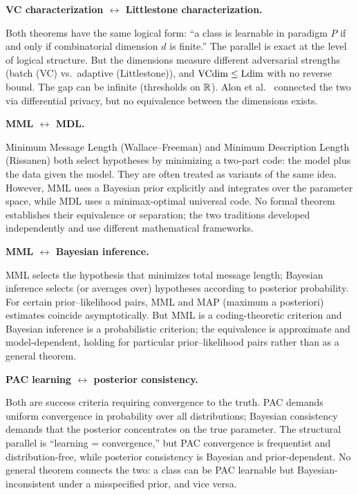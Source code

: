 \begin{obstbox}
\textbf{VC characterization $\leftrightarrow$ Littlestone
characterization.}

\medskip\noindent
Both theorems have the same logical form: ``a class is learnable in
paradigm $P$ if and only if combinatorial dimension $d$ is finite.''
The parallel is exact at the level of logical structure. But the
dimensions measure different adversarial strengths (batch (VC) vs.\
adaptive (Littlestone)), and $\mathrm{VCdim} \leq \mathrm{Ldim}$ with no reverse
bound.
The gap can be infinite (thresholds on $\mathbb{R}$). Alon et
al.~\cite{AlonLivniMalliarisMoran2019} connected the two via
differential privacy, but no equivalence between the dimensions exists.
\end{obstbox}

\begin{obstbox}
\textbf{MML $\leftrightarrow$ MDL.}

\medskip\noindent
Minimum Message Length (Wallace--Freeman) and Minimum Description Length
(Rissanen) both select hypotheses by minimizing a two-part code: the
model plus the data given the model. They are often treated as variants
of the same idea. However, MML uses a Bayesian prior explicitly and
integrates over the parameter space, while MDL uses a minimax-optimal
universal code. No formal theorem establishes their equivalence or
separation; the two traditions developed independently and use different
mathematical frameworks.
\end{obstbox}

\begin{obstbox}
\textbf{MML $\leftrightarrow$ Bayesian inference.}

\medskip\noindent
MML selects the hypothesis that minimizes total message length; Bayesian
inference selects (or averages over) hypotheses according to posterior
probability. For certain prior--likelihood pairs, MML and MAP
(maximum a posteriori) estimates coincide asymptotically. But MML is a
coding-theoretic criterion and Bayesian inference is a probabilistic
criterion; the equivalence is approximate and model-dependent, holding for
particular prior--likelihood pairs rather than as a general theorem.
\end{obstbox}

\begin{obstbox}
\textbf{PAC learning $\leftrightarrow$ posterior consistency.}

\medskip\noindent
Both are success criteria requiring convergence to the truth. PAC
demands uniform convergence in probability over all distributions;
Bayesian consistency demands that the posterior concentrates on the true
parameter. The structural parallel is ``learning = convergence,'' but
PAC convergence is frequentist and distribution-free, while posterior
consistency is Bayesian and prior-dependent. No general theorem
connects the two: a class can be PAC learnable but Bayesian-inconsistent
under a misspecified prior, and vice versa.
\end{obstbox}

